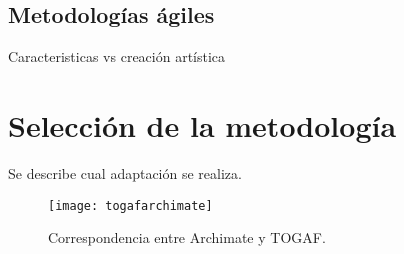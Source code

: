 \subsection{Metodologías ágiles}

Caracteristicas vs creación artística

\section{Selección de la metodología}

Se describe cual adaptación se realiza.










\begin{figure}[h]\label{togafarchimate}
\centering
\texttt{[image: togafarchimate]}
\caption{Correspondencia entre Archimate y TOGAF.}
\end{figure}
